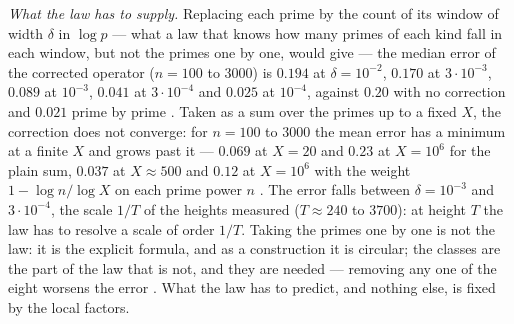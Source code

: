 \emph{What the law has to supply.}  Replacing each prime by the count of its window of width
$\delta$ in $\log p$ --- what a law that knows how many primes of each kind fall in each window,
but not the primes one by one, would give --- the median error of the corrected operator
($n=100$ to $3000$) is $0.194$ at $\delta=10^{-2}$, $0.170$ at $3\cdot10^{-3}$, $0.089$ at $10^{-3}$,
$0.041$ at $3\cdot10^{-4}$ and $0.025$ at $10^{-4}$, against $0.20$ with no correction and
$0.021$ prime by prime .  Taken as a sum over the primes up to a fixed $X$, the
correction does not converge: for $n=100$ to $3000$ the mean error has a minimum at a finite $X$ and grows past it ---
$0.069$ at $X=20$ and $0.23$ at $X=10^6$ for the plain sum, $0.037$ at $X\approx500$ and $0.12$ at $X=10^6$ with the
weight $1-\log n/\log X$ on each prime power $n$ .  The error falls between
$\delta=10^{-3}$ and $3\cdot10^{-4}$, the scale $1/T$ of the heights measured ($T\approx240$ to
$3700$): at
height $T$ the law has to resolve a scale of order $1/T$.  Taking the primes one by one is not
the law: it is the explicit formula, and as a construction it is circular; the classes are the part of the law that is not, and they are needed --- removing any one of the eight worsens the error .
What the law has to predict, and nothing else, is fixed by the local factors.


